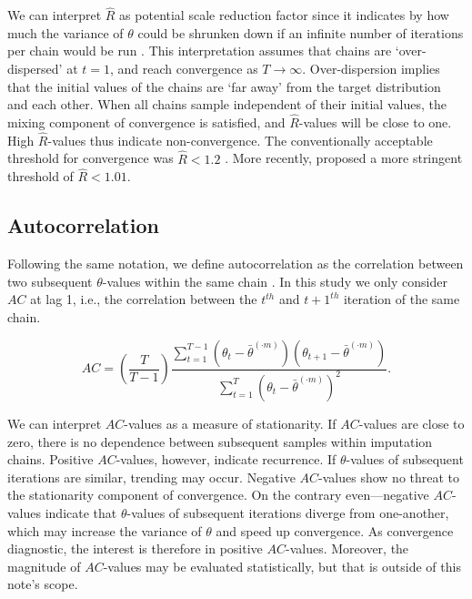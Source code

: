 \documentclass[Royal,times,sageh]{sagej}
\begin{document}
We can interpret \(\widehat{R}\) as potential scale reduction factor
since it indicates by how much the variance of \(\theta\) could be
shrunken down if an infinite number of iterations per chain would be run
\citep{gelm92}. This interpretation assumes that chains are
`over-dispersed' at \(t=1\), and reach convergence as \(T \to \infty\).
Over-dispersion implies that the initial values of the chains are `far
away' from the target distribution and each other. When all chains
sample independent of their initial values, the mixing component of
convergence is satisfied, and \(\widehat{R}\)-values will be close to
one. High \(\widehat{R}\)-values thus indicate non-convergence. The
conventionally acceptable threshold for convergence was
\(\widehat{R} < 1.2\) \citep{gelm92}. More recently, \citet{veht19}
proposed a more stringent threshold of \(\widehat{R} < 1.01\).

\hypertarget{autocorrelation}{%
\subsection{Autocorrelation}\label{autocorrelation}}

Following the same notation, we define autocorrelation as the
correlation between two subsequent \(\theta\)-values within the same
chain \citep[p.~147]{lync07}. In this study we only consider \(AC\) at
lag 1, i.e., the correlation between the \(t^{th}\) and \(t+1^{th}\)
iteration of the same chain.

\begin{equation*}
AC = \left( \frac{T}{T-1} \right) \frac{\sum_{t=1}^{T-1}(\theta_t - \bar{\theta}^{(\cdot m)})(\theta_{t+1} - \bar{\theta}^{(\cdot m)})}{\sum_{t=1}^{T}(\theta_t - \bar{\theta}^{(\cdot m)})^2}.
\end{equation*}

We can interpret \(AC\)-values as a measure of stationarity. If
\(AC\)-values are close to zero, there is no dependence between
subsequent samples within imputation chains. Positive \(AC\)-values,
however, indicate recurrence. If \(\theta\)-values of subsequent
iterations are similar, trending may occur. Negative \(AC\)-values show
no threat to the stationarity component of convergence. On the contrary
even---negative \(AC\)-values indicate that \(\theta\)-values of
subsequent iterations diverge from one-another, which may increase the
variance of \(\theta\) and speed up convergence. As convergence
diagnostic, the interest is therefore in positive \(AC\)-values.
Moreover, the magnitude of \(AC\)-values may be evaluated statistically,
but that is outside of this note's scope.
\end{document}
